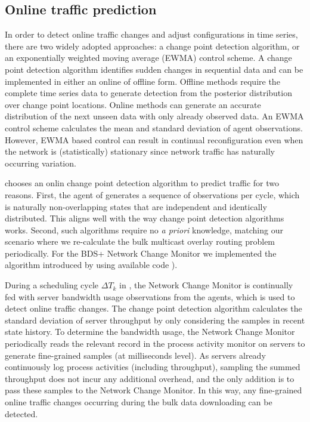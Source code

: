 {\subsection{Online traffic prediction}
\label{subsec:dynamic:prediction}
In order to detect online traffic changes and adjust configurations in time series, there are two widely adopted approaches: a change point detection algorithm, or an exponentially weighted moving average (EWMA) control scheme. A change point detection algorithm identifies sudden changes in sequential data and can be implemented in either an online of offline form. Offline methods \cite{smith1975bayesian,stephens1994bayesian,barry1993bayesian,green1995reversible} require the complete time series data to generate detection from the posterior distribution over change point locations. Online methods \cite{page1955test,desobry2005online,lorden1971procedures} can generate an accurate distribution of the next unseen data with only already observed data. An EWMA control scheme \cite{roberts1959control,lucas1990exponentially} calculates the mean and standard deviation of agent observations. However, EWMA based control can result in continual reconfiguration even when the network is (statistically) stationary since network traffic has naturally occurring variation.

\newname chooses an onlin change point detection algorithm \cite{adams2007bayesian} to predict traffic for two reasons. First, the agent of \name generates a sequence of observations per cycle, which is naturally non-overlapping states that are independent and identically distributed. This aligns well with the way change point detection algorithms works. Second, such algorithms require no \emph{a priori} knowledge, matching our scenario where we re-calculate the bulk multicast overlay routing problem periodically. For the BDS+ Network Change Monitor we implemented the algorithm introduced by \cite{adams2007bayesian} using available code \cite{BOCDcode}).

During a scheduling cycle $\Delta T_k$ in \name, the Network Change Monitor is continually fed with server bandwidth usage observations from the agents, which is used to detect online traffic changes. The change point detection algorithm calculates the standard deviation of server throughput by only considering the samples in recent state history. To determine the bandwidth usage, the Network Change Monitor periodically reads the relevant record in the process activity monitor on servers to generate fine-grained samples (at milliseconds level). As servers already continuously log process activities (including throughput), sampling the summed throughput does not incur any additional overhead, and the only addition is to pass these samples to the Network Change Monitor. In this way, any fine-grained online traffic changes occurring during the bulk data downloading can be detected.


}
